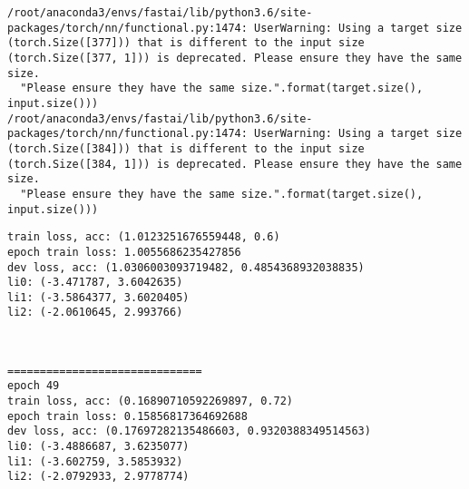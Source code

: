 \documentclass[11pt]{article}
\begin{document}
    \begin{Verbatim}[commandchars=\\\{\}]
/root/anaconda3/envs/fastai/lib/python3.6/site-packages/torch/nn/functional.py:1474: UserWarning: Using a target size (torch.Size([377])) that is different to the input size (torch.Size([377, 1])) is deprecated. Please ensure they have the same size.
  "Please ensure they have the same size.".format(target.size(), input.size()))
/root/anaconda3/envs/fastai/lib/python3.6/site-packages/torch/nn/functional.py:1474: UserWarning: Using a target size (torch.Size([384])) that is different to the input size (torch.Size([384, 1])) is deprecated. Please ensure they have the same size.
  "Please ensure they have the same size.".format(target.size(), input.size()))

    \end{Verbatim}

    \begin{Verbatim}[commandchars=\\\{\}]
train loss, acc: (1.0123251676559448, 0.6)
epoch train loss: 1.0055686235427856
dev loss, acc: (1.0306003093719482, 0.4854368932038835)
li0: (-3.471787, 3.6042635)
li1: (-3.5864377, 3.6020405)
li2: (-2.0610645, 2.993766)

    \end{Verbatim}

    \begin{center}
    \end{center}
    { \hspace*{\fill} \\}
    
    \begin{Verbatim}[commandchars=\\\{\}]
==============================
epoch 49
train loss, acc: (0.16890710592269897, 0.72)
epoch train loss: 0.15856817364692688
dev loss, acc: (0.17697282135486603, 0.9320388349514563)
li0: (-3.4886687, 3.6235077)
li1: (-3.602759, 3.5853932)
li2: (-2.0792933, 2.9778774)

    \end{Verbatim}

    \begin{center}
    \end{center}
    { \hspace*{\fill} \\}
    
\end{document}
